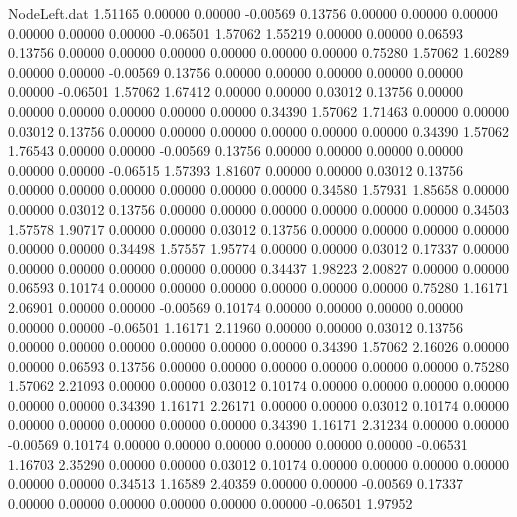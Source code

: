 \begin{filecontents}{NodeLeft.dat}
   1.51165    0.00000    0.00000    -0.00569    0.13756    0.00000    0.00000    0.00000    0.00000    0.00000    0.00000   -0.06501    1.57062
   1.55219    0.00000    0.00000     0.06593    0.13756    0.00000    0.00000    0.00000    0.00000    0.00000    0.00000    0.75280    1.57062
   1.60289    0.00000    0.00000    -0.00569    0.13756    0.00000    0.00000    0.00000    0.00000    0.00000    0.00000   -0.06501    1.57062
   1.67412    0.00000    0.00000     0.03012    0.13756    0.00000    0.00000    0.00000    0.00000    0.00000    0.00000    0.34390    1.57062
   1.71463    0.00000    0.00000     0.03012    0.13756    0.00000    0.00000    0.00000    0.00000    0.00000    0.00000    0.34390    1.57062
   1.76543    0.00000    0.00000    -0.00569    0.13756    0.00000    0.00000    0.00000    0.00000    0.00000    0.00000   -0.06515    1.57393
   1.81607    0.00000    0.00000     0.03012    0.13756    0.00000    0.00000    0.00000    0.00000    0.00000    0.00000    0.34580    1.57931
   1.85658    0.00000    0.00000     0.03012    0.13756    0.00000    0.00000    0.00000    0.00000    0.00000    0.00000    0.34503    1.57578
   1.90717    0.00000    0.00000     0.03012    0.13756    0.00000    0.00000    0.00000    0.00000    0.00000    0.00000    0.34498    1.57557
   1.95774    0.00000    0.00000     0.03012    0.17337    0.00000    0.00000    0.00000    0.00000    0.00000    0.00000    0.34437    1.98223
   2.00827    0.00000    0.00000     0.06593    0.10174    0.00000    0.00000    0.00000    0.00000    0.00000    0.00000    0.75280    1.16171
   2.06901    0.00000    0.00000    -0.00569    0.10174    0.00000    0.00000    0.00000    0.00000    0.00000    0.00000   -0.06501    1.16171
   2.11960    0.00000    0.00000     0.03012    0.13756    0.00000    0.00000    0.00000    0.00000    0.00000    0.00000    0.34390    1.57062
   2.16026    0.00000    0.00000     0.06593    0.13756    0.00000    0.00000    0.00000    0.00000    0.00000    0.00000    0.75280    1.57062
   2.21093    0.00000    0.00000     0.03012    0.10174    0.00000    0.00000    0.00000    0.00000    0.00000    0.00000    0.34390    1.16171
   2.26171    0.00000    0.00000     0.03012    0.10174    0.00000    0.00000    0.00000    0.00000    0.00000    0.00000    0.34390    1.16171
   2.31234    0.00000    0.00000    -0.00569    0.10174    0.00000    0.00000    0.00000    0.00000    0.00000    0.00000   -0.06531    1.16703
   2.35290    0.00000    0.00000     0.03012    0.10174    0.00000    0.00000    0.00000    0.00000    0.00000    0.00000    0.34513    1.16589
   2.40359    0.00000    0.00000    -0.00569    0.17337    0.00000    0.00000    0.00000    0.00000    0.00000    0.00000   -0.06501    1.97952

\end{filecontents}
